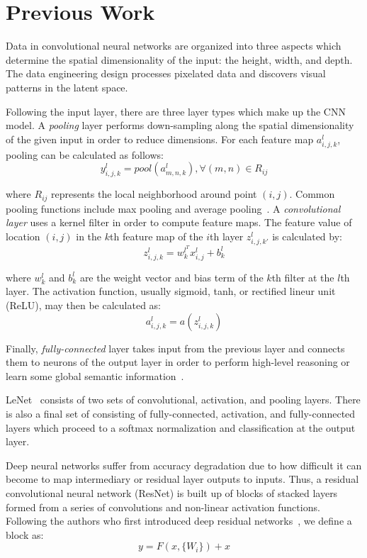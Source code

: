 \section{Previous Work}

Data in convolutional neural networks are organized into three aspects which determine the spatial dimensionality of the input: the height, width, and depth. The data engineering design processes pixelated data and discovers visual patterns in the latent space.

Following the input layer, there are three layer types which make up the CNN model. A \textit{pooling} layer performs down-sampling along the spatial dimensionality of the given input in order to reduce dimensions. For each feature map $a^l_{i, j, k}$, pooling can be calculated as follows:
\begin{equation}
    y^l_{i, j, k} = pool(a^l_{m, n, k}), \forall(m, n) \in R_{ij}
\end{equation}

where $R_{ij}$ represents the local neighborhood around point $(i,j)$. Common pooling functions include max pooling and average pooling~\cite{gu2018recent}. A \textit{convolutional layer} uses a kernel filter in order to compute feature maps. The feature value of location $(i, j)$ in the $k$th feature map of the $i$th layer $z^l_{i, j, k'}$ is calculated by:
\begin{equation}
    z^l_{i, j, k} = w^{l^{T}}_kx^l_{i, j} + b^l_k
\end{equation}

where $w_k^l$ and $b_k^l$ are the weight vector and bias term of the $k$th filter at the $l$th layer. The activation function, usually sigmoid, tanh, or rectified lineur unit (ReLU), may then be calculated as:
\begin{equation}
    a^l_{i, j, k} = a(z^l_{i, j, k})
\end{equation}

 Finally, \textit{fully-connected} layer takes input from the previous layer and connects them to neurons of the output layer in order to perform high-level reasoning or learn some global semantic information~\cite{OShea2015AnIT}.

LeNet~\cite{lenet} consists of two sets of convolutional, activation, and pooling layers. There is also a final set of consisting of fully-connected, activation, and fully-connected layers which proceed to a softmax normalization and classification at the output layer.

Deep neural networks suffer from accuracy degradation due to how difficult it can become to map intermediary or residual layer outputs to inputs. Thus, a residual convolutional neural network (ResNet) is built up of blocks of stacked layers formed from a series of convolutions and non-linear activation functions. Following the authors who first introduced deep residual networks~\cite{resnet}, we define a block as:
\begin{equation}
    y = F(x, \{W_i\}) + x
\end{equation}

